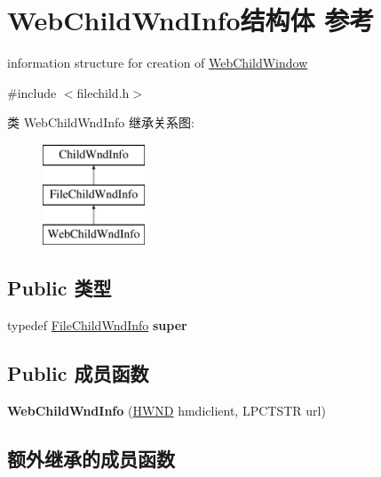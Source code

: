 \hypertarget{struct_web_child_wnd_info}{}\section{Web\+Child\+Wnd\+Info结构体 参考}
\label{struct_web_child_wnd_info}


information structure for creation of \hyperlink{struct_web_child_window}{Web\+Child\+Window}  




{\ttfamily \#include $<$filechild.\+h$>$}

类 Web\+Child\+Wnd\+Info 继承关系图\+:\begin{figure}[H]
\begin{center}
\leavevmode
\includegraphics[height=3.000000cm]{struct_web_child_wnd_info}
\end{center}
\end{figure}
\subsection*{Public 类型}
\begin{DoxyCompactItemize}
\item 
\mbox{\label{struct_web_child_wnd_info_ac563e8420eaea4ba832f3c44f27e37b5}} 
typedef \hyperlink{struct_file_child_wnd_info}{File\+Child\+Wnd\+Info} {\bfseries super}
\end{DoxyCompactItemize}
\subsection*{Public 成员函数}
\begin{DoxyCompactItemize}
\item 
\mbox{\label{struct_web_child_wnd_info_a0d62412252a06120f71d23b41ab1c38a}} 
{\bfseries Web\+Child\+Wnd\+Info} (\hyperlink{interfacevoid}{H\+W\+ND} hmdiclient, L\+P\+C\+T\+S\+TR url)
\end{DoxyCompactItemize}
\subsection*{额外继承的成员函数}


